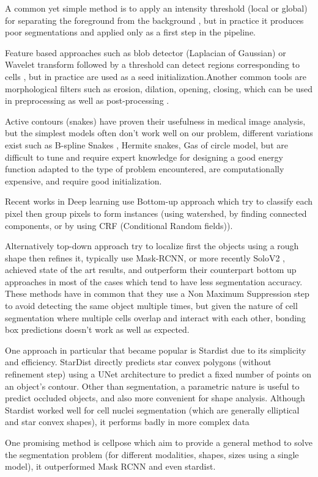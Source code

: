 \documentclass[main.tex]{subfiles}
\begin{document}
A common yet simple method is to apply an intensity threshold (local or global) for separating the foreground from the background \cite{Meijering2012}, but in practice it produces poor segmentations and applied only as a first step in the pipeline.\par
Feature based approaches  such as blob detector (Laplacian of Gaussian)\cite{Hafiz2020} or Wavelet transform  followed by a threshold can detect regions corresponding to cells \cite{Boquet-Pujadas2021}, but in practice are used as a seed initialization.Another common tools are morphological filters such as erosion, dilation, opening, closing, which can be used in preprocessing as well as post-processing \cite{Meijering2012}.\par
Active contours (snakes) have proven their usefulness in medical image analysis\cite{Boquet-Pujadas2021}, but the simplest models often don't work well on our problem, different variations exist such as B-spline Snakes \cite{Brigger2000}, Hermite snakes\cite{Uhlmann2016}, Gas of circle model\cite{Molnar2016}, but are difficult to tune and require expert knowledge for designing a good energy function adapted to the type of problem encountered, are computationally expensive, and require good initialization.\par
Recent works in Deep learning use Bottom-up \cite{Hafiz2020} approach which try to classify each pixel then group pixels to form instances (using watershed, by finding connected components, or by using CRF (Conditional Random fields)\cite{Arnab2018}).\par
Alternatively top-down \cite{Hafiz2020} approach try to localize first the objects using a rough shape then refines it, typically use Mask-RCNN\cite{Hafiz2020, he2017mask, johnson2018adapting}, or more recently SoloV2 \cite{Wang2020}, achieved state of the art results, and outperform their counterpart bottom up approaches in most of the cases which tend to have less segmentation accuracy. These methods have in common that they use a Non Maximum Suppression step to avoid detecting the same object multiple times, but given the nature of cell segmentation where multiple cells overlap and interact with each other, bonding box predictions doesn't work as well as expected.\par
One approach in particular that became popular is Stardist\cite{Schmidt2018} due to its simplicity and efficiency. StarDist directly predicts star convex polygons (without refinement step) using a UNet\cite{Ronneberger2015} architecture to predict a fixed number of points on an object's contour. Other than segmentation, a parametric nature is useful to predict occluded objects, and also more convenient for shape analysis. Although Stardist worked well for cell nuclei segmentation (which are generally elliptical and star convex shapes), it performs badly in more complex data\par
One promising method is cellpose \cite{Stringer2020} which aim to provide a general method to solve the segmentation problem (for different modalities, shapes, sizes using a single model), it outperformed Mask RCNN and even stardist.\\
\end{document}
